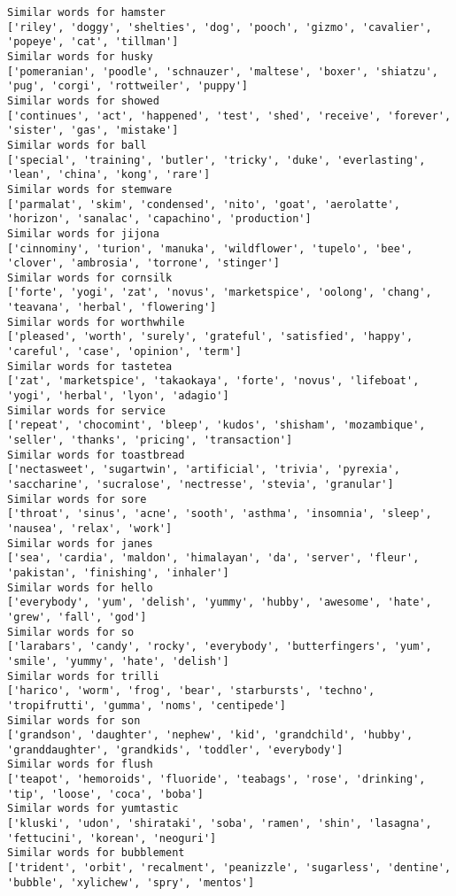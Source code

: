 \documentclass[11pt]{article}
\begin{document}
\begin{Verbatim}[commandchars=\\\{\}]
Similar words for hamster
['riley', 'doggy', 'shelties', 'dog', 'pooch', 'gizmo', 'cavalier', 'popeye', 'cat', 'tillman']
Similar words for husky
['pomeranian', 'poodle', 'schnauzer', 'maltese', 'boxer', 'shiatzu', 'pug', 'corgi', 'rottweiler', 'puppy']
Similar words for showed
['continues', 'act', 'happened', 'test', 'shed', 'receive', 'forever', 'sister', 'gas', 'mistake']
Similar words for ball
['special', 'training', 'butler', 'tricky', 'duke', 'everlasting', 'lean', 'china', 'kong', 'rare']
Similar words for stemware
['parmalat', 'skim', 'condensed', 'nito', 'goat', 'aerolatte', 'horizon', 'sanalac', 'capachino', 'production']
Similar words for jijona
['cinnominy', 'turion', 'manuka', 'wildflower', 'tupelo', 'bee', 'clover', 'ambrosia', 'torrone', 'stinger']
Similar words for cornsilk
['forte', 'yogi', 'zat', 'novus', 'marketspice', 'oolong', 'chang', 'teavana', 'herbal', 'flowering']
Similar words for worthwhile
['pleased', 'worth', 'surely', 'grateful', 'satisfied', 'happy', 'careful', 'case', 'opinion', 'term']
Similar words for tastetea
['zat', 'marketspice', 'takaokaya', 'forte', 'novus', 'lifeboat', 'yogi', 'herbal', 'lyon', 'adagio']
Similar words for service
['repeat', 'chocomint', 'bleep', 'kudos', 'shisham', 'mozambique', 'seller', 'thanks', 'pricing', 'transaction']
Similar words for toastbread
['nectasweet', 'sugartwin', 'artificial', 'trivia', 'pyrexia', 'saccharine', 'sucralose', 'nectresse', 'stevia', 'granular']
Similar words for sore
['throat', 'sinus', 'acne', 'sooth', 'asthma', 'insomnia', 'sleep', 'nausea', 'relax', 'work']
Similar words for janes
['sea', 'cardia', 'maldon', 'himalayan', 'da', 'server', 'fleur', 'pakistan', 'finishing', 'inhaler']
Similar words for hello
['everybody', 'yum', 'delish', 'yummy', 'hubby', 'awesome', 'hate', 'grew', 'fall', 'god']
Similar words for so
['larabars', 'candy', 'rocky', 'everybody', 'butterfingers', 'yum', 'smile', 'yummy', 'hate', 'delish']
Similar words for trilli
['harico', 'worm', 'frog', 'bear', 'starbursts', 'techno', 'tropifrutti', 'gumma', 'noms', 'centipede']
Similar words for son
['grandson', 'daughter', 'nephew', 'kid', 'grandchild', 'hubby', 'granddaughter', 'grandkids', 'toddler', 'everybody']
Similar words for flush
['teapot', 'hemoroids', 'fluoride', 'teabags', 'rose', 'drinking', 'tip', 'loose', 'coca', 'boba']
Similar words for yumtastic
['kluski', 'udon', 'shirataki', 'soba', 'ramen', 'shin', 'lasagna', 'fettucini', 'korean', 'neoguri']
Similar words for bubblement
['trident', 'orbit', 'recalment', 'peanizzle', 'sugarless', 'dentine', 'bubble', 'xylichew', 'spry', 'mentos']

\end{Verbatim}
\end{document}
